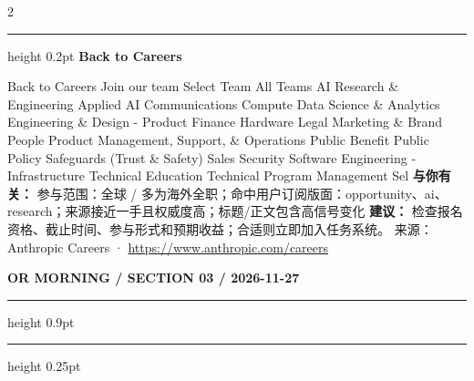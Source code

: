 \documentclass[10.5pt]{ctexart}
\begin{document}
\begin{multicols}{2}
\vspace{2mm}
\hrule height 0.2pt
\vspace{2mm}
{\large\bfseries Back to Careers}\par
Back to Careers Join our team Select Team All Teams AI Research \& Engineering Applied AI Communications Compute Data Science \& Analytics Engineering \& Design - Product Finance Hardware Legal Marketing \& Brand People Product Management, Support, \& Operations Public Benefit Public Policy Safeguards (Trust \& Safety) Sales Security Software Engineering - Infrastructure Technical Education Technical Program Management Sel
\textbf{与你有关：} 参与范围：全球 / 多为海外全职；命中用户订阅版面：opportunity、ai、research；来源接近一手且权威度高；标题/正文包含高信号变化
\textbf{建议：} 检查报名资格、截止时间、参与形式和预期收益；合适则立即加入任务系统。
{\footnotesize\color{ormuted} 来源：Anthropic Careers · \url{https://www.anthropic.com/careers}}
\end{multicols}
\newpage
{\small\bfseries OR MORNING / SECTION 03 / 2026-11-27}
\vspace{2mm}
\hrule height 0.9pt
\vspace{1.5mm}
\hrule height 0.25pt
\vspace{4mm}
\end{document}
